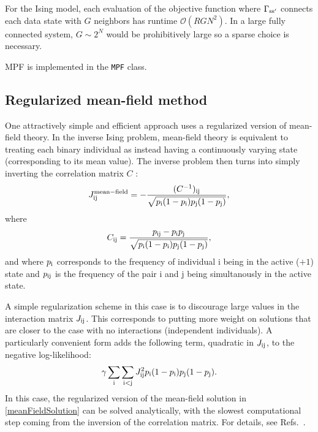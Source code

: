 \documentclass[aps,prl,twocolumn,nofootinbib]{revtex4-1}
\begin{document}

For the Ising model, each evaluation of the objective function where $\Gamma_{\rm s s'}$ connects each data state with $G$ neighbors has runtime $\mathcal{O}(RGN^2)$. In a large fully connected system, $G\sim 2^N$ would be prohibitively large so a sparse choice is necessary.

MPF is implemented in the {\tt MPF} class.

\subsection{Regularized mean-field method}
One attractively simple and efficient approach uses a regularized version of
mean-field theory.  In the inverse Ising problem, mean-field theory is equivalent
to treating each binary individual as instead having a continuously varying state
(corresponding to its mean value).  The inverse problem then turns into simply inverting
the correlation matrix $C$ \cite{CocMon12}:
\begin{equation}
\label{meanFieldSolution}
J^{\mathrm{mean-field}}_{\rm ij} =
    - \frac{ (C^{-1})_{\rm ij} }{ \sqrt{p_{\rm i}(1-p_{\rm i})p_{\rm j}(1-p_{\rm j})} },
\end{equation}
where
\begin{equation}
C_{\rm ij} = \frac{ p_{\rm ij} - p_{\rm i} p_{\rm j} }{ \sqrt{p_{\rm i}(1-p_{\rm i})p_{\rm j}(1-p_{\rm j})} },
\end{equation}
and where $p_{\rm i}$ corresponds to the frequency of individual i being
in the active ($+1$) state and $p_{\rm ij}$ is the frequency of the pair
i and j being simultanously in the active state.

A simple regularization scheme in this case is to discourage large values in the interaction
matrix $J_{\rm ij}$.  This corresponds to putting more weight on solutions that are closer to
the case with no interactions (independent individuals).  A particularly convenient form
adds the following term, quadratic in $J_{\rm ij}$, to the negative log-likelihood:
\begin{equation}
\gamma \sum_{\rm i} \sum_{\rm i<j} J_{\rm ij}^2 p_{\rm i} (1-p_{\rm i}) p_{\rm j} (1-p_{\rm j}).
\end{equation}
In this case, the regularized version of the mean-field solution in \eqref{meanFieldSolution}
can be solved analytically, with the slowest computational step coming from the inversion
of the correlation matrix.  For details, see Refs.~\cite{Daniels:2017cq,BarCoc13}.
\end{document}
